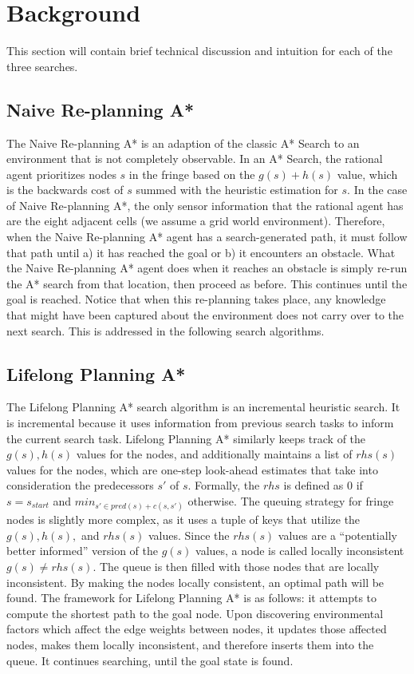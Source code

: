 

\section{Background}
	This section will contain brief technical discussion and intuition for each of the three searches.
	\subsection{Naive Re-planning A*}
	    The Naive Re-planning A* is an adaption of the classic A* Search to an environment that is not completely observable. In an A* Search, the rational agent prioritizes nodes $s$ in the fringe based on the $g(s)+h(s)$ value, which is the backwards cost of $s$ summed with the heuristic estimation for $s$. In the case of Naive Re-planning A*, the only sensor information that the rational agent has are the eight adjacent cells (we assume a grid world environment). Therefore, when the Naive Re-planning A* agent has a search-generated path, it must follow that path until a) it has reached the goal or b) it encounters an obstacle. What the Naive Re-planning A* agent does when it reaches an obstacle is simply re-run the A* search from that location, then proceed as before. This continues until the goal is reached. Notice that when this re-planning takes place, any knowledge that might have been captured about the environment does not carry over to the next search. This is addressed in the following search algorithms.

	\subsection{Lifelong Planning A*}
	    The Lifelong Planning A* search algorithm is an incremental heuristic search. It is incremental because it uses information from previous search tasks to inform the current search task. Lifelong Planning A* similarly keeps track of the $g(s),h(s)$ values for the nodes, and additionally maintains a list of $rhs(s)$ values for the nodes, which are one-step look-ahead estimates that take into consideration the predecessors $s'$ of $s$. Formally, the $rhs$ is defined as 0 if $s=s_{start}$ and $min_{s'\in pred(s) + c(s,s')}$ otherwise. The queuing strategy for fringe nodes is slightly more complex, as it uses a tuple of keys that utilize the $g(s),h(s),$ and $rhs(s)$ values. Since the $rhs(s)$ values are a ``potentially better informed'' version of the $g(s)$ values, a node is called locally inconsistent $g(s) \neq rhs(s)$. The queue is then filled with those nodes that are locally inconsistent. By making the nodes locally consistent, an optimal path will be found. 
	    The framework for Lifelong Planning A* is as follows: it attempts to compute the shortest path to the goal node. Upon discovering environmental factors which affect the edge weights between nodes, it updates those affected nodes, makes them locally inconsistent, and therefore inserts them into the queue. It continues searching, until the goal state is found. 
	
